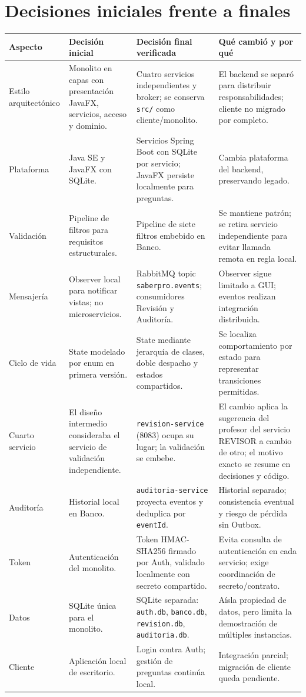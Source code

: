 \documentclass[12pt,a4paper]{article}
\begin{document}
\section{Decisiones iniciales frente a finales}
\begin{landscape}
\small
\renewcommand{\arraystretch}{0.88}
\begin{tabularx}{\linewidth}{p{3.0cm}p{4.4cm}p{5.0cm}X}
\toprule Aspecto & Decisión inicial & Decisión final verificada & Qué cambió y por qué \\
\midrule
Estilo arquitectónico & Monolito en capas con presentación JavaFX, servicios, acceso y dominio. & Cuatro servicios independientes y broker; se conserva \texttt{src/} como cliente/monolito. & El backend se separó para distribuir responsabilidades; cliente no migrado por completo. \\
Plataforma & Java SE y JavaFX con SQLite. & Servicios Spring Boot con SQLite por servicio; JavaFX persiste localmente para preguntas. & Cambia plataforma del backend, preservando legado. \\
Validación & Pipeline de filtros para requisitos estructurales. & Pipeline de siete filtros embebido en Banco. & Se mantiene patrón; se retira servicio independiente para evitar llamada remota en regla local. \\
Mensajería & Observer local para notificar vistas; no microservicios. & RabbitMQ topic \texttt{saberpro.events}; consumidores Revisión y Auditoría. & Observer sigue limitado a GUI; eventos realizan integración distribuida. \\
Ciclo de vida & State modelado por enum en primera versión. & State mediante jerarquía de clases, doble despacho y estados compartidos. & Se localiza comportamiento por estado para representar transiciones permitidas. \\
Cuarto servicio & El diseño intermedio consideraba el servicio de validación independiente. & \texttt{revision-service} (8083) ocupa su lugar; la validación se embebe. & El cambio aplica la sugerencia del profesor del servicio REVISOR a cambio de otro; el motivo exacto se resume en decisiones y código. \\
Auditoría & Historial local en Banco. & \texttt{auditoria-service} proyecta eventos y deduplica por \texttt{eventId}. & Historial separado; consistencia eventual y riesgo de pérdida sin Outbox. \\
Token & Autenticación del monolito. & Token HMAC-SHA256 firmado por Auth, validado localmente con secreto compartido. & Evita consulta de autenticación en cada servicio; exige coordinación de secreto/contrato. \\
Datos & SQLite única para el monolito. & SQLite separada: \texttt{auth.db}, \texttt{banco.db}, \texttt{revision.db}, \texttt{auditoria.db}. & Aísla propiedad de datos, pero limita la demostración de múltiples instancias. \\
Cliente & Aplicación local de escritorio. & Login contra Auth; gestión de preguntas continúa local. & Integración parcial; migración de cliente queda pendiente. \\
\bottomrule
\end{tabularx}
\end{landscape}
\clearpage
\end{document}
